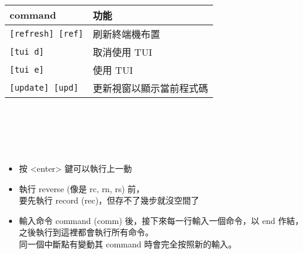 \begin{center}
     \\
    \begin{tabular}{|p{2.7cm}|p{2.7cm}|}
        \hline
        command                         & 功能 \\
        \hline
        \verb|[refresh] [ref]|          & 刷新終端機布置 \\
        \verb|[tui d]|                  & 取消使用 TUI \\
        \verb|[tui e]|                  & 使用 TUI \\
        \verb|[update] [upd]|           & 更新視窗以顯示當前程式碼 \\
        \hline
    \end{tabular} \\
    \hspace{\fill} \\
    \hspace{\fill} \\

     \\
    \begin{itemize}
        \item 按 <enter> 鍵可以執行上一動
        \item 執行 reverse (像是 rc, rn, rs) 前，\\
              要先執行 record (rec)，但存不了幾步就沒空間了
        \item 輸入命令 command (comm) 後，接下來每一行輸入一個命令，以 end 作結，之後執行到這裡都會執行所有命令。 \\
              同一個中斷點有變動其 command 時會完全按照新的輸入。
    \end{itemize}
\end{center}